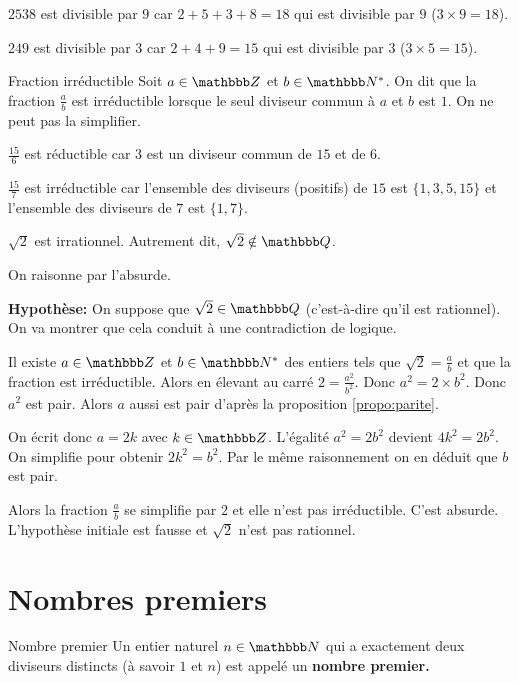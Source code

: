 \documentclass[10pt,a4paper,openany,twoside,prof]{book}
\begin{document}
\begin{ex}{}{}
  $2 538$ est divisible par $9$ car $2 + 5 + 3 + 8 = 18$ qui est divisible par $9$ ($3 \times 9 = 18$).

   $249$ est divisible par $3$ car $2 + 4 + 9 = 15$ qui est divisible par $3$ ($3 \times 5 = 15$).
\end{ex}


\begin{defi}{Fraction irréductible}{}
  Soit $a\in\Z$ et $b\in\N^*$. On dit que la fraction $\frac{a}{b}$ est irréductible lorsque le seul diviseur commun à $a$ et $b$ est $1$. On ne peut pas la simplifier.
\end{defi}

\begin{ex}{}{}
  $\frac{15}{6}$ est réductible car $3$ est un diviseur commun de $15$ et de $6$.

\smallskip
  $\frac{15}{7}$ est irréductible car l'ensemble des diviseurs (positifs) de $15$ est $\{1,3,5,15\}$ et l'ensemble des diviseurs de $7$ est $\{1,7\}$.
\end{ex}

\begin{prop}{}{}
	$\sqrt{2}$ est irrationnel. Autrement dit, $\sqrt{2}\notin\Q$.
\end{prop}

\begin{deme}{}{}
	On raisonne par l'absurde.

	\textbf{Hypothèse:} On suppose que $\sqrt{2}\in\Q$ (c'est-à-dire qu'il est rationnel). On va montrer que cela conduit à une contradiction de logique.

	Il existe $a\in\Z$ et $b\in\N^*$ des entiers tels que $\sqrt{2} = \frac{a}{b}$ et que la fraction est irréductible. Alors en élevant au carré $2 = \frac{a^2}{b^2}$. Donc $a^2=2\times b^2$. Donc $a^2$ est pair. Alors $a$ aussi est pair d'après la proposition \ref{propo:parite}.

	On écrit donc $a=2k$ avec $k\in\Z$. L'égalité $a^2=2b^2$ devient $4k^2 = 2b^2$. On simplifie pour obtenir $2k^2=b^2$. Par le même raisonnement on en déduit que $b$ est pair.

	Alors la fraction $\frac{a}{b}$ se simplifie par $2$ et elle n'est pas irréductible. C'est absurde. L'hypothèse initiale est fausse et $\sqrt{2}$ n'est pas rationnel.
\end{deme}

\section{Nombres premiers}
\begin{defi}{Nombre premier}{}
Un entier naturel $n\in\N$ qui a exactement deux diviseurs distincts (à savoir $1$ et $n$) est appelé un \bf{nombre premier}.
\end{defi}
\end{document}
